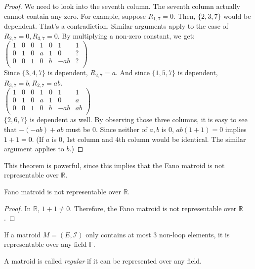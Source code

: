 \begin{proof}
We need to look into the seventh column.
The seventh column actually cannot contain any zero.
For example, suppose $R_{1, 7} = 0$.
Then, $\{2, 3, 7 \}$ would be dependent.
That's a contradiction.
Similar arguments apply to the case of $R_{2, 7} = 0, R_{3, 7} = 0$.
By multiplying a non-zero constant, we get:\\
$\begin{pmatrix}
1 & 0 & 0 & 1 & 0 & 1 & 1 \\
0 & 1 & 0 & a & 1 & 0 & ? \\
0 & 0 & 1 & 0 & b & -ab & ? \\
\end{pmatrix}$\\
Since $\{3, 4, 7\}$ is dependent, $R_{2, 7} = a$.
And since $\{1, 5, 7\}$ is dependent, $R_{3, 7} = b, R_{2, 7} = ab$.\\
$\begin{pmatrix}
1 & 0 & 0 & 1 & 0 & 1 & 1 \\
0 & 1 & 0 & a & 1 & 0 & a \\
0 & 0 & 1 & 0 & b & -ab & ab \\
\end{pmatrix}$\\
$\{ 2, 6, 7 \}$ is dependent as well.
By observing those three columns, it is easy to see that $-(-ab) + ab$ must be 0.
Since neither of $a, b$ is 0, $ab(1 + 1) = 0$ implies $1 + 1 = 0$.
(If $a$ is 0, 1st column and 4th column would be identical. The similar argument applies to $b$.)
\end{proof}

This theorem is powerful, since this implies that the Fano matroid is not representable over $\mathbb{R}$.

\begin{cor}
Fano matroid is not representable over $\mathbb{R}$.
\end{cor}

\begin{proof}
In $\mathbb{R}$, $1 + 1 \neq 0$. Therefore, the Fano matroid is not representable over $\mathbb{R}$.
\end{proof}


\begin{thm}
If a matroid $M = (E, \mathcal{I})$ only contains at most 3 non-loop elements, it is representable over any field $\mathbb{F}$.
\end{thm}

A matroid is called \textit{regular} if it can be represented over any field.

